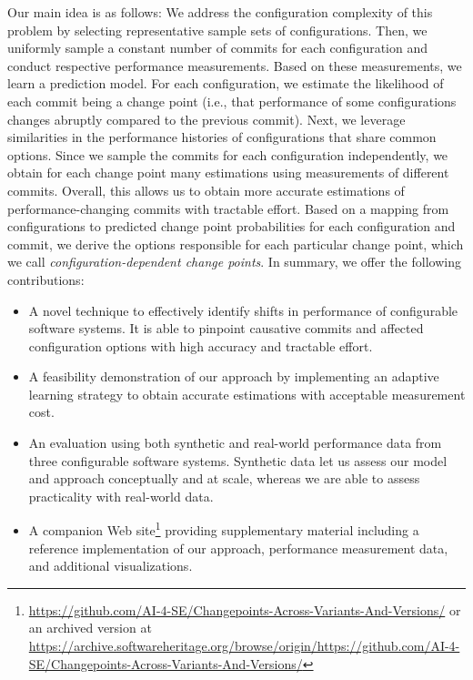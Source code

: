 \documentclass[sigconf]{acmart}
\begin{document}
	Our main idea is as follows: We address the configuration complexity of this problem by selecting representative sample sets of configurations.
	Then, we uniformly sample a constant number of commits for each configuration and conduct respective performance measurements.
	Based on these measurements, we learn a prediction model.
	For each configuration, we estimate the likelihood of each commit being a change point (i.e., that performance of some configurations changes abruptly compared to the previous commit).
	Next, we leverage similarities in the performance histories of configurations that share common options.
	Since we sample the commits for each configuration independently, we obtain for each change point many estimations using measurements of different commits.
	Overall, this allows us to obtain more accurate estimations of performance-changing commits with tractable effort.
	Based on a mapping from configurations to predicted change point probabilities for each configuration and commit, we derive the options responsible for each particular change point, which we call \emph{configuration-dependent change points}. 	
	In summary, we offer the following contributions:
	\begin{itemize}
		\item A novel technique to effectively identify shifts in performance of configurable software systems. It is able to pinpoint causative commits and affected configuration options with high accuracy and tractable effort.
		\item A feasibility demonstration of our approach by implementing an adaptive learning strategy to obtain accurate estimations with acceptable measurement cost.
		\item An evaluation using both synthetic and real-world performance data from three configurable software systems. Synthetic data let us assess our model and approach conceptually and at scale, whereas we are able to assess practicality with real-world data.
		\item A companion Web site\footnote{\url{https://github.com/AI-4-SE/Changepoints-Across-Variants-And-Versions/} or an archived version at \url{https://archive.softwareheritage.org/browse/origin/https://github.com/AI-4-SE/Changepoints-Across-Variants-And-Versions/}} providing supplementary material including a reference implementation of our approach, performance measurement data, and additional visualizations.
	\end{itemize}
	
\end{document}
